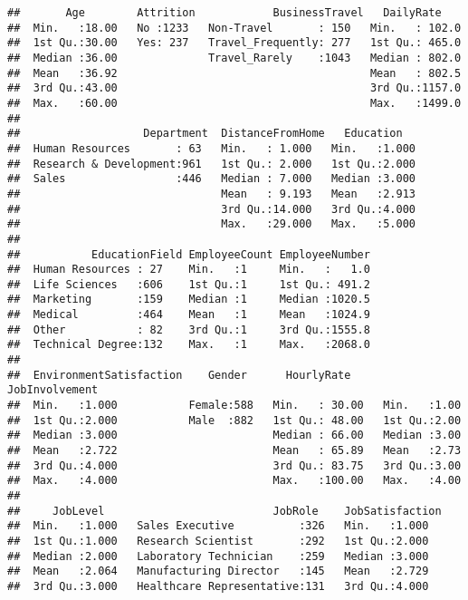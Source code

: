 \documentclass[]{article}
\begin{document}
\begin{verbatim}
##       Age        Attrition            BusinessTravel   DailyRate     
##  Min.   :18.00   No :1233   Non-Travel       : 150   Min.   : 102.0  
##  1st Qu.:30.00   Yes: 237   Travel_Frequently: 277   1st Qu.: 465.0  
##  Median :36.00              Travel_Rarely    :1043   Median : 802.0  
##  Mean   :36.92                                       Mean   : 802.5  
##  3rd Qu.:43.00                                       3rd Qu.:1157.0  
##  Max.   :60.00                                       Max.   :1499.0  
##                                                                      
##                   Department  DistanceFromHome   Education    
##  Human Resources       : 63   Min.   : 1.000   Min.   :1.000  
##  Research & Development:961   1st Qu.: 2.000   1st Qu.:2.000  
##  Sales                 :446   Median : 7.000   Median :3.000  
##                               Mean   : 9.193   Mean   :2.913  
##                               3rd Qu.:14.000   3rd Qu.:4.000  
##                               Max.   :29.000   Max.   :5.000  
##                                                               
##           EducationField EmployeeCount EmployeeNumber  
##  Human Resources : 27    Min.   :1     Min.   :   1.0  
##  Life Sciences   :606    1st Qu.:1     1st Qu.: 491.2  
##  Marketing       :159    Median :1     Median :1020.5  
##  Medical         :464    Mean   :1     Mean   :1024.9  
##  Other           : 82    3rd Qu.:1     3rd Qu.:1555.8  
##  Technical Degree:132    Max.   :1     Max.   :2068.0  
##                                                        
##  EnvironmentSatisfaction    Gender      HourlyRate     JobInvolvement
##  Min.   :1.000           Female:588   Min.   : 30.00   Min.   :1.00  
##  1st Qu.:2.000           Male  :882   1st Qu.: 48.00   1st Qu.:2.00  
##  Median :3.000                        Median : 66.00   Median :3.00  
##  Mean   :2.722                        Mean   : 65.89   Mean   :2.73  
##  3rd Qu.:4.000                        3rd Qu.: 83.75   3rd Qu.:3.00  
##  Max.   :4.000                        Max.   :100.00   Max.   :4.00  
##                                                                      
##     JobLevel                          JobRole    JobSatisfaction
##  Min.   :1.000   Sales Executive          :326   Min.   :1.000  
##  1st Qu.:1.000   Research Scientist       :292   1st Qu.:2.000  
##  Median :2.000   Laboratory Technician    :259   Median :3.000  
##  Mean   :2.064   Manufacturing Director   :145   Mean   :2.729  
##  3rd Qu.:3.000   Healthcare Representative:131   3rd Qu.:4.000  

\end{verbatim}
\end{document}
